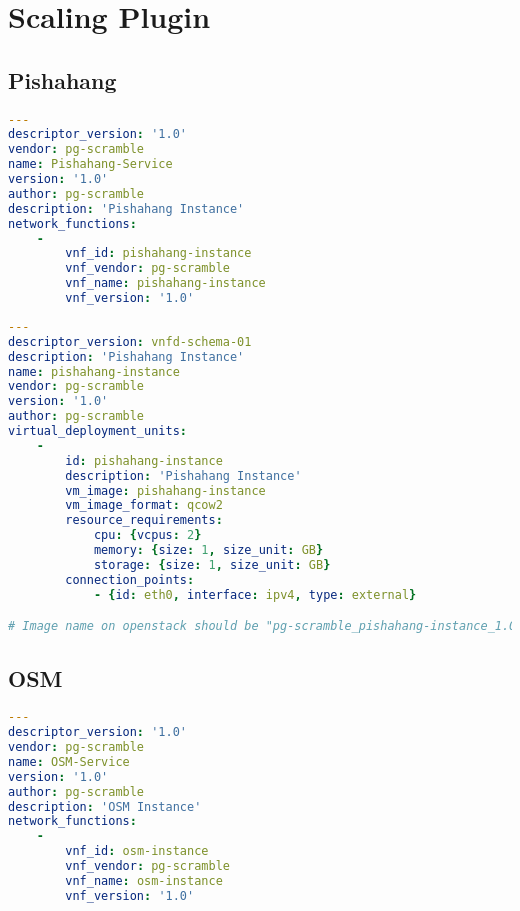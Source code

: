 \newpage
\section{Scaling Plugin}
\label{appendix:slp}
\subsection{Pishahang}

\begin{lstlisting}[language=yaml,caption=Pishahang MANO instance NSD,label=pishmanonsd]
---
descriptor_version: '1.0'
vendor: pg-scramble
name: Pishahang-Service
version: '1.0'
author: pg-scramble
description: 'Pishahang Instance'
network_functions:
    -
        vnf_id: pishahang-instance
        vnf_vendor: pg-scramble
        vnf_name: pishahang-instance
        vnf_version: '1.0'

\end{lstlisting}

\begin{lstlisting}[language=yaml,caption=Pishahang MANO instance VNFD,label=pishmanovnfd]
---
descriptor_version: vnfd-schema-01
description: 'Pishahang Instance'
name: pishahang-instance
vendor: pg-scramble
version: '1.0'
author: pg-scramble
virtual_deployment_units:
    -
        id: pishahang-instance
        description: 'Pishahang Instance'
        vm_image: pishahang-instance
        vm_image_format: qcow2
        resource_requirements:
            cpu: {vcpus: 2}
            memory: {size: 1, size_unit: GB}
            storage: {size: 1, size_unit: GB}
        connection_points:
            - {id: eth0, interface: ipv4, type: external}

# Image name on openstack should be "pg-scramble_pishahang-instance_1.0_pishahang-instance"


\end{lstlisting}

\newpage
\subsection{OSM}

\begin{lstlisting}[language=yaml,caption=OSM MANO instance NSD,label=osmmanonsd]
---
descriptor_version: '1.0'
vendor: pg-scramble
name: OSM-Service
version: '1.0'
author: pg-scramble
description: 'OSM Instance'
network_functions:
    -
        vnf_id: osm-instance
        vnf_vendor: pg-scramble
        vnf_name: osm-instance
        vnf_version: '1.0'

\end{lstlisting}

